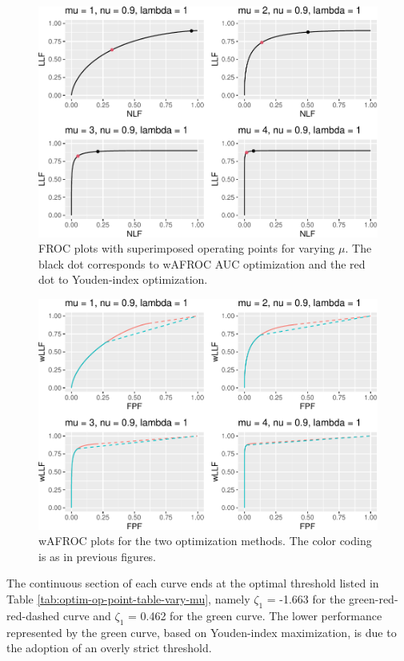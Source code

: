 \documentclass[
]{book}
\begin{document}
\begin{figure}
\centering
\includegraphics{21-optim-op-point_files/figure-latex/optim-op-point-vary-mu-froc-1.pdf}
\caption{\label{fig:optim-op-point-vary-mu-froc}FROC plots with superimposed operating points for varying \(\mu\). The black dot corresponds to wAFROC AUC optimization and the red dot to Youden-index optimization.}
\end{figure}

\begin{figure}
\centering
\includegraphics{21-optim-op-point_files/figure-latex/optim-op-point-vary-mu-wafroc-1.pdf}
\caption{\label{fig:optim-op-point-vary-mu-wafroc}wAFROC plots for the two optimization methods. The color coding is as in previous figures.}
\end{figure}

The continuous section of each curve ends at the optimal threshold listed in Table \ref{tab:optim-op-point-table-vary-mu}, namely \(\zeta_1\) = -1.663 for the green-red-red-dashed curve and \(\zeta_1\) = 0.462 for the green curve. The lower performance represented by the green curve, based on Youden-index maximization, is due to the adoption of an overly strict threshold.
\end{document}
